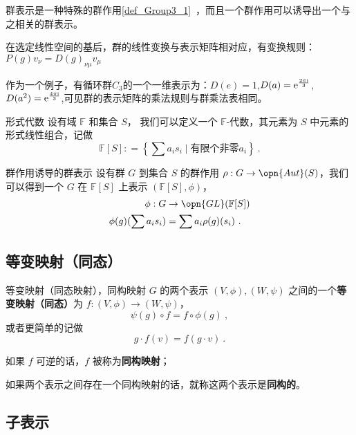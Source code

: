 群表示是一种特殊的群作用\autoref{def_Group3_1}~，而且一个群作用可以诱导出一个与之相关的群表示。

在选定线性空间的基后，群的线性变换与表示矩阵相对应，有变换规则：$P(g)v_\nu=D(g)_{\nu\mu}v_\mu$

作为一个例子，有循环群$C_3$的一个一维表示为：$D(e)=1$,$D(a)=\rm{e}^{\frac{2\pi i}{3}}$,$D(a^2)=\rm{e}^{\frac{4\pi i}{3}}$,可见群的表示矩阵的乘法规则与群乘法表相同。


\begin{definition}{形式代数}
设有域 $\mathbb{F}$ 和集合 $S$， 我们可以定义一个 $\mathbb{F}$-代数，其元素为 $S$ 中元素的形式线性组合，记做
$$
\mathbb{F}[S]: = \left\{ \sum a_i s_i \mid \text{有限个非零} a_i \right\}~.
$$
\end{definition}

\begin{definition}{群作用诱导的群表示}
设有群 $G$ 到集合 $S$ 的群作用 $\rho: G \to \opn{Aut}(S)$，我们可以得到一个 $G$ 在 $\mathbb{F}[S]$ 上表示 $(\mathbb{F}[S], \phi)$，
$$\begin{aligned}
\phi: G &\to \opn{GL}(\mathbb{F}[S]) \\
\phi(g)(\sum a_i s_i) &= \sum a_i \rho(g)(s_i)~.
\end{aligned}$$
\end{definition}

\subsection{等变映射（同态）}

\begin{definition}{等变映射（同态映射），同构映射}
$G$ 的两个表示 $(V, \phi), (W, \psi)$ 之间的一个\textbf{等变映射（同态）}为 $f: (V, \phi) \to (W, \psi)$，
$$
\psi(g) \circ f = f \circ \phi(g)~,
$$
或者更简单的记做
$$
g \cdot f(v) = f(g \cdot v)~.
$$

如果 $f$ 可逆的话，$f$ 被称为\textbf{同构映射}；

如果两个表示之间存在一个同构映射的话，就称这两个表示是\textbf{同构的}。
\end{definition}


\subsection{子表示}


